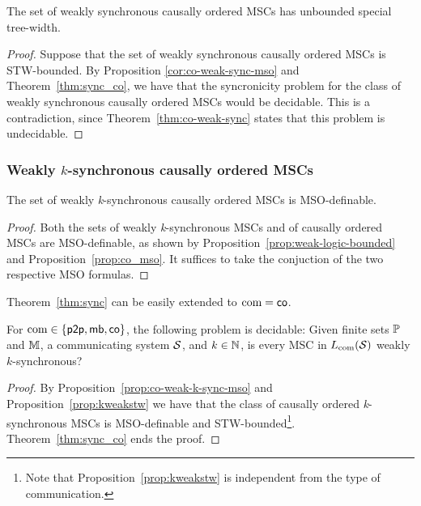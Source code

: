 \begin{corollary}
The set of weakly synchronous causally ordered MSCs has unbounded special tree-width.
\end{corollary}
\begin{proof}
Suppose that the set of weakly synchronous causally ordered MSCs is STW-bounded. By Proposition \ref{cor:co-weak-sync-mso} and Theorem~\ref{thm:sync_co}, we have that the syncronicity problem for the class of weakly synchronous causally ordered MSCs would be decidable. This is a contradiction, since Theorem~\ref{thm:co-weak-sync} states that this problem is undecidable.
\end{proof}

\subsubsection{Weakly \texorpdfstring{$k$}{k}-synchronous causally ordered MSCs} 

\begin{proposition}\label{prop:co-weak-k-sync-mso}
The set of weakly \emph{k}-synchronous causally ordered MSCs is MSO-definable.
\end{proposition}
\begin{proof}
Both the sets of weakly \emph{k}-synchronous MSCs and of causally ordered MSCs are MSO-definable, as shown by Proposition~\ref{prop:weak-logic-bounded} and Proposition~\ref{prop:co_mso}. It suffices to take the conjuction of the two respective MSO formulas.
\end{proof}

Theorem~\ref{thm:sync} can be easily extended to $\textup{com} = \mathsf{co}$.

\begin{theorem}\label{thm:co-weak-k-sync}
For $\textup{com} \in \{\mathsf{p2p}, \mathsf{mb},\mathsf{co}\}$, the following problem is decidable:
Given finite sets $\mathbb{P}$ and $\mathbb{M}$, a communicating system $\mathcal{S}$, and $k \in \mathbb{N}$,
is every MSC in $L_{\textup{com}}(\mathcal{S})$ weakly $k$-synchronous?
\end{theorem}
\begin{proof}
By Proposition~\ref{prop:co-weak-k-sync-mso} and Proposition~\ref{prop:kweakstw} we have that the class of causally ordered \emph{k}-synchronous MSCs is MSO-definable and STW-bounded\footnote{Note that Proposition~\ref{prop:kweakstw} is independent from the type of communication.}. Theorem~\ref{thm:sync_co} ends the proof.
\end{proof}

